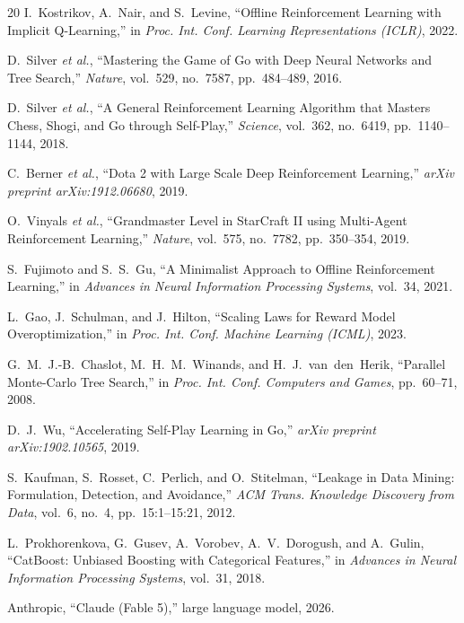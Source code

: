 \documentclass[journal]{IEEEtran}
\begin{document}
\begin{thebibliography}{20}
I.~Kostrikov, A.~Nair, and S.~Levine, ``Offline Reinforcement Learning with Implicit Q-Learning,'' in \textit{Proc. Int. Conf. Learning Representations (ICLR)}, 2022.

D.~Silver \textit{et al.}, ``Mastering the Game of Go with Deep Neural Networks and Tree Search,'' \textit{Nature}, vol.~529, no.~7587, pp.~484--489, 2016.

D.~Silver \textit{et al.}, ``A General Reinforcement Learning Algorithm that Masters Chess, Shogi, and Go through Self-Play,'' \textit{Science}, vol.~362, no.~6419, pp.~1140--1144, 2018.

C.~Berner \textit{et al.}, ``Dota 2 with Large Scale Deep Reinforcement Learning,'' \textit{arXiv preprint arXiv:1912.06680}, 2019.

O.~Vinyals \textit{et al.}, ``Grandmaster Level in StarCraft II using Multi-Agent Reinforcement Learning,'' \textit{Nature}, vol.~575, no.~7782, pp.~350--354, 2019.

S.~Fujimoto and S.~S.~Gu, ``A Minimalist Approach to Offline Reinforcement Learning,'' in \textit{Advances in Neural Information Processing Systems}, vol.~34, 2021.

L.~Gao, J.~Schulman, and J.~Hilton, ``Scaling Laws for Reward Model Overoptimization,'' in \textit{Proc. Int. Conf. Machine Learning (ICML)}, 2023.

G.~M.~J.-B.~Chaslot, M.~H.~M.~Winands, and H.~J.~van~den~Herik, ``Parallel Monte-Carlo Tree Search,'' in \textit{Proc. Int. Conf. Computers and Games}, pp.~60--71, 2008.

D.~J.~Wu, ``Accelerating Self-Play Learning in Go,'' \textit{arXiv preprint arXiv:1902.10565}, 2019.

S.~Kaufman, S.~Rosset, C.~Perlich, and O.~Stitelman, ``Leakage in Data Mining: Formulation, Detection, and Avoidance,'' \textit{ACM Trans. Knowledge Discovery from Data}, vol.~6, no.~4, pp.~15:1--15:21, 2012.

L.~Prokhorenkova, G.~Gusev, A.~Vorobev, A.~V.~Dorogush, and A.~Gulin, ``CatBoost: Unbiased Boosting with Categorical Features,'' in \textit{Advances in Neural Information Processing Systems}, vol.~31, 2018.

Anthropic, ``Claude (Fable 5),'' large language model, 2026.


\end{thebibliography}
\end{document}
